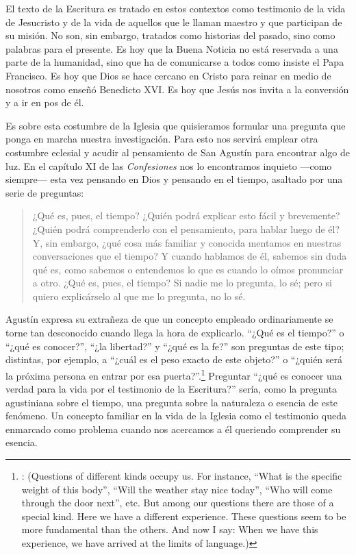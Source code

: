 El texto de la Escritura es tratado en estos contextos como testimonio de la
vida de Jesucristo y de la vida de aquellos que le llaman maestro y que
participan de su misión. No son, sin embargo, tratados como historias del
pasado, sino como palabras para el presente. Es hoy que la Buena Noticia no está
reservada a una parte de la humanidad, sino que ha de comunicarse a todos como
insiste el Papa Francisco. Es hoy que Dios se hace cercano en Cristo para reinar
en medio de nosotros como enseñó Benedicto XVI. Es hoy que Jesús nos invita a la
conversión y a ir en pos de él.

Es sobre esta costumbre de la Iglesia que quisieramos formular una pregunta que
ponga en marcha nuestra investigación. Para esto nos servirá emplear otra
costumbre eclesial y acudir al pensamiento de San Agustín para encontrar algo de
luz. En el capítulo XI de las \emph{Confesiones} nos lo encontramos inquieto
---como siempre--- esta vez pensando en Dios y pensando en el tiempo, asaltado
por una serie de preguntas:

\blockquote[{\cite[XI.14 n.17]{confesiones}}]{¿Qué es, pues, el tiempo? ¿Quién
  podrá explicar esto fácil y brevemente? ¿Quién podrá comprenderlo con el
  pensamiento, para hablar luego de él? Y, sin embargo, ¿qué cosa más familiar y
  conocida mentamos en nuestras conversaciones que el tiempo? Y cuando hablamos
  de él, sabemos sin duda qué es, como sabemos o entendemos lo que es cuando lo
  oímos pronunciar a otro. ¿Qué es, pues, el tiempo? Si nadie me lo pregunta, lo
  sé; pero si quiero explicárselo al que me lo pregunta, no lo sé.}

Agustín expresa su extrañeza de que un concepto empleado ordinariamente se torne
tan desconocido cuando llega la hora de explicarlo. \enquote{¿Qué es el tiempo?}
o \enquote{¿qué es conocer?}, \enquote{¿la libertad?} y \enquote{¿qué es la fe?}
son preguntas de este tipo; distintas, por ejemplo, a \enquote{¿cuál es el peso
  exacto de este objeto?} o \enquote{¿quién será la próxima persona en entrar
  por esa puerta?}.\footnote{\cite[Cf.~][304]{wittgenstein2005bt}: (Questions of
  different kinds occupy us. For instance, ``What is the specific weight of this
  body'', ``Will the weather stay nice today'', ``Who will come through the door
  next'', etc. But among our questions there are those of a special kind. Here
  we have a different experience. These questions seem to be more fundamental
  than the others. And now I say: When we have this experience, we have arrived
  at the limits of language.)} Preguntar \enquote{¿qué es conocer una verdad
  para la vida por el testimonio de la Escritura?} sería, como la pregunta
agustiniana sobre el tiempo, una pregunta sobre la naturaleza o esencia de este
fenómeno. Un concepto familiar en la vida de la Iglesia como el testimonio queda
enmarcado como problema cuando nos acercamos a él queriendo comprender su
esencia.

